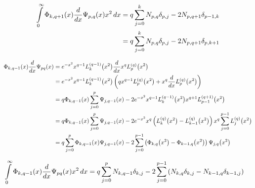 \documentclass{article}[draft]
\begin{document}
\begin{align*}
\myint_0^\infty \Phi_{k,q+1}\of{x} \frac{d}{dx}\Psi_{p,q}\of{x} x^2 \diff{x}
&= q \sum_{j=0}^{k} N_{p,q} \delta_{p,j} 
- 2 N_{p,q+1} \delta_{p-1,k} 
\\
&= q \sum_{j=0}^{k} N_{p,q} \delta_{p,j} 
- 2 N_{p,q+1} \delta_{p,k+1} 
\end{align*}

\begin{align*}
\Phi_{k, q-1}\of{x} \frac{d}{dx}\Psi_{pq}\of{x}
&= e^{-x^2} x^{q-1} \lp{q-1}{k}\of{x^2} \frac{d}{dx} x^{q} \lp{q}{p}\of{x^2}
\\
&= e^{-x^2} x^{q-1} \lp{q-1}{k}\of{x^2} 
\left(
q x^{q-1} L^{(q)}_p\of{x^2}
+ x^{q} \frac{d}{dx} L^{(q)}_p\of{x^2}
\right)
\\
&= q \Phi_{k, q-1}\of{x} \sum_{j=0}^p \Psi_{j,q-1}\of{x}
- 2 e^{-x^2} x^{q-1} \lp{q-1}{k}\of{x^2}  x^{q+1} \lp{q+1}{p-1}\of{x^2}
\\
&= q \Phi_{k, q-1}\of{x} \sum_{j=0}^p \Psi_{j,q-1}\of{x}
- 2 e^{-x^2} x^{q} \left( \lp{q}{k}\of{x^2} - \lp{q}{k-1}\of{x^2}\right)  x^{q} \sum_{j=0}^{p-1}\lp{q}{j}\of{x^2}
\\
&= q \sum_{j=0}^p \Phi_{k, q-1}\of{x} \Psi_{j,q-1}\of{x}
- 2 \sum_{j=0}^{p-1} \left( \Phi_{k,q}\of{x^2} - \Phi_{k-1,q}\of{x^2}\right) \Psi_{j,q}\of{x^2}
\end{align*}

\begin{align*}
\myint_0^\infty \Phi_{k, q-1}\of{x} \frac{d}{dx}\Psi_{pq}\of{x} x^2 \diff{x}
&= q \sum_{j=0}^{p} N_{k,q-1} \delta_{k,j} 
- 2 \sum_{j=0}^{p-1} \left( N_{k,q} \delta_{k,j} - N_{k-1,q} \delta_{k-1,j}  \right)
\end{align*}

\end{document}
